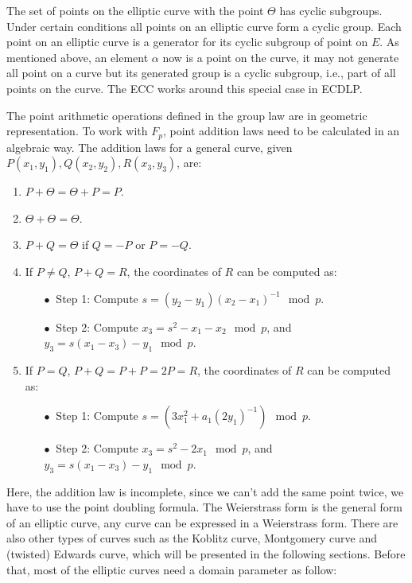The set of points on the elliptic curve with the point $\Theta$ has cyclic subgroups. Under certain conditions all points on an elliptic curve form a cyclic group. Each point on an elliptic curve is a generator for its cyclic subgroup of point on $E$. As mentioned above, an element $\alpha$ now is a point on the curve, it may not generate all point on a curve but its generated group is a cyclic subgroup, i.e., part of all points on the curve. The ECC works around this special case in ECDLP.

The point arithmetic operations defined in the group law are in geometric representation. To work with $F_p$, point addition laws need to be calculated in an algebraic way. The addition laws for a general curve, given $P(x_1, y_1), Q(x_2, y_2), R(x_3, y_3)$, are:

\begin{enumerate}
  \item $P + \Theta = \Theta + P = P$.
  \item $\Theta + \Theta = \Theta$.
  \item $P + Q = \Theta$ if $Q = -P$ or $P = -Q$.
  \item If $P \neq Q$, $P + Q = R$, the coordinates of $R$ can be computed as:

        \begin{itemize}
        \addtolength{\itemindent}{1cm}
          \item[$\bullet \ $ Step 1:] Compute $s = (y_2 - y_1) (x_2 - x_1)^{-1} \mod p$.
          \item[$\bullet \ $ Step 2:] Compute $x_3 = s^2 - x_1 - x_2 \mod p$, and $y_3 = s(x_1 - x_3) - y_1 \mod p$.
        \end{itemize}

  \item If $P = Q$, $P + Q = P + P = 2P = R$, the coordinates of $R$ can be computed as:

        \begin{itemize}
        \addtolength{\itemindent}{1cm}
          \item[$\bullet \ $ Step 1:] Compute $s = (3x_1^2 + a_1 (2y_1)^{-1}) \mod p$.
          \item[$\bullet \ $ Step 2:] Compute $x_3 = s^2 - 2x_1 \mod p$, and $y_3 = s(x_1 - x_3) - y_1 \mod p$.
        \end{itemize}

\end{enumerate}

Here, the addition law is incomplete, since we can’t add the same point twice, we have to use the point doubling formula. The Weierstrass form is the general form of an elliptic curve, any curve can be expressed in a Weierstrass form. There are also other types of curves such as the Koblitz curve, Montgomery curve and (twisted) Edwards curve, which will be presented in the following sections. Before that, most of the elliptic curves need a domain parameter as follow:

